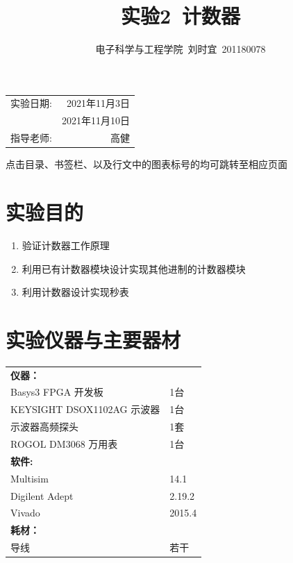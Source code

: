 \documentclass[UTF8]{ctexart}
\title{\textbf{实验2\ 计数器}} %
\author{电子科学与工程学院\ 刘时宜\ 201180078} %
\date{} %
\numberwithin{figure}{subsection}
\numberwithin{table}{subsection}
\numberwithin{equation}{subsection}
\begin{document}
\pagestyle{EE_Digital1Exp_template}

\maketitle %

\begin{center}
    \begin{tabular}{l r}
    实验日期: & 2021年11月3日 \\ %
     & 2021年11月10日 \\ %
    指导老师: & 高健 %
    \end{tabular}
    \par 点击目录、书签栏、以及行文中的图表标号的均可跳转至相应页面
    \end{center}
    

\tableofcontents

\section{实验目的}
\begin{enumerate}
    \item 验证计数器工作原理
    \item 利用已有计数器模块设计实现其他进制的计数器模块
    \item 利用计数器设计实现秒表
\end{enumerate}

\section{实验仪器与主要器材}
\begin{center}
    \begin{tabular}{ll}
        \textbf{仪器：} & \\
        Basys3 FPGA 开发板 & 1台\\
        KEYSIGHT DSOX1102AG 示波器 & 1台\\
        示波器高频探头 & 1套\\
        ROGOL DM3068 万用表 & 1台\\
        \textbf{软件:} & \\
        Multisim & 14.1 \\
        Digilent Adept & 2.19.2 \\
        Vivado & 2015.4 \\
        \textbf{耗材：} & \\
        导线 & 若干 \\
    \end{tabular}
\end{center}
\end{document}
